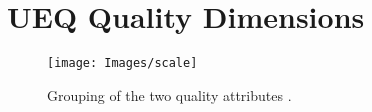 
%


\chapter{\gls{UEQ} Quality Dimensions}
\label{ann:quality_dimensions}




\begin{figure}[h!]
    \centering
    \texttt{[image: Images/scale]}
    \caption{Grouping of the two quality attributes \cite{article_sca}.} 
    \label{fig:scale}
\end{figure}
